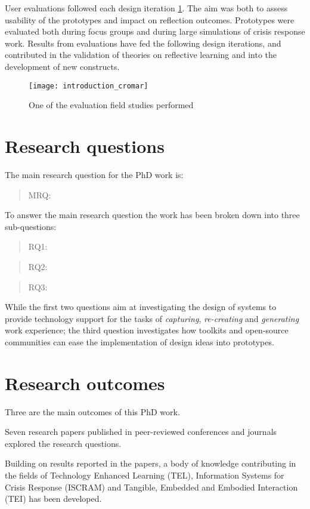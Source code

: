 User evaluations followed each design iteration \ref{fig:cromar}. The aim was both to assess usability of the prototypes and impact on reflection outcomes. Prototypes were evaluated both during focus groups and during large simulations of crisis response work. Results from evaluations have fed the following design iterations, and contributed in the validation of theories on reflective learning and into the development of new constructs.
\begin{figure}
	[tbh] \centering 
	\texttt{[image: introduction\_cromar]} 
	\caption{One of the evaluation field studies performed} 
	\label{fig:cromar} 
\end{figure}

\section{Research questions}\label{research-questions}

The main research question for the PhD work is:
\begin{quote}
	MRQ: \MRQ 
\end{quote}

To answer the main research question the work has been broken down into three sub-questions:
\begin{quote}
	RQ1: \RQi 
\end{quote}
\begin{quote}
	RQ2: \RQii 
\end{quote}
\begin{quote}
	RQ3: \RQiii 
\end{quote}

While the first two questions aim at investigating the design of systems to provide technology support for the tasks of \emph{capturing}, \emph{re-creating} and \emph{generating} work experience; the third question investigates how toolkits and open-source communities can ease the implementation of design ideas into prototypes.

\section{Research outcomes}\label{research-outcomes}

Three are the main outcomes of this PhD work.

Seven research papers published in peer-reviewed conferences and journals explored the research questions.

Building on results reported in the papers, a body of knowledge contributing in the fields of Technology Enhanced Learning (TEL), Information Systems for Crisis Response (ISCRAM) and Tangible, Embedded and Embodied Interaction (TEI) has been developed.

